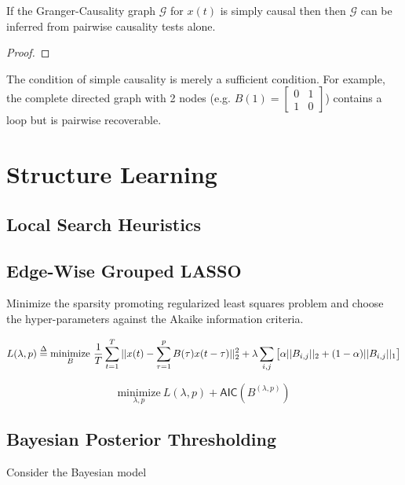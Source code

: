 \documentclass[12pt]{article}
\def\gcg{\mathcal{G}}  %
\begin{document}
\begin{theorem}
  \label{thm:tree_recovery}
  If the Granger-Causality graph $\gcg$ for $x(t)$ is simply causal
  then then $\gcg$ can be inferred from pairwise causality tests
  alone.
\end{theorem}
\begin{proof}
  
\end{proof}

\begin{example}
  The condition of simple causality is merely a sufficient condition.  For example, the complete directed graph with 2 nodes (e.g. $B(1) = \left[ \begin{array}{cc} 0 & 1 \\ 1 & 0 \end{array} \right]$) contains a loop but is pairwise recoverable.
\end{example}

\section{Structure Learning}
\subsection{Local Search Heuristics}


\subsection{Edge-Wise Grouped LASSO}
Minimize the sparsity promoting regularized least squares problem and choose the hyper-parameters against the Akaike information criteria.

\begin{equation}
  L(\lambda, p) \overset{\Delta}{=} \underset{B}{\text{minimize}}\ \frac{1}{T}\sum_{t = 1}^T||x(t) - \sum_{\tau = 1}^pB(\tau)x(t - \tau)||_2^2 + \lambda \sum_{i, j}\big[\alpha||B_{i, j}||_2 + (1 - \alpha)||B_{i, j}||_1\big]
\end{equation}

\begin{equation}
  \underset{\lambda, p}{\text{minimize}}\ L(\lambda, p) + \mathsf{AIC}(B^{(\lambda, p)})
\end{equation}

\subsection{Bayesian Posterior Thresholding}
Consider the Bayesian model
\end{document}
